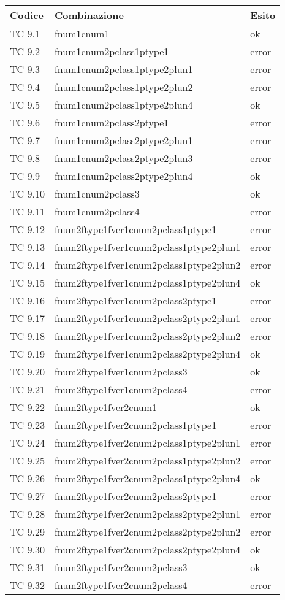 \begin{longtable}{|p{3cm}|p{7cm}|p{3cm}|}
	\hline
	\rowcolor{Gray}
	\textbf{Codice} & \textbf{Combinazione} & \textbf{Esito}\tabularnewline
	\hline
	TC 9.1			& fnum1cnum1					& ok \tabularnewline
	\hline
	TC 9.2			& fnum1cnum2pclass1ptype1			& error \tabularnewline
	\hline
	TC 9.3			& fnum1cnum2pclass1ptype2plun1			& error \tabularnewline
	\hline
	TC 9.4			& fnum1cnum2pclass1ptype2plun2			& error \tabularnewline
	\hline
	TC 9.5			& fnum1cnum2pclass1ptype2plun4			& ok \tabularnewline
	\hline
	TC 9.6			& fnum1cnum2pclass2ptype1			& error \tabularnewline
	\hline
	TC 9.7			& fnum1cnum2pclass2ptype2plun1			& error \tabularnewline
	\hline
	TC 9.8			& fnum1cnum2pclass2ptype2plun3			& error \tabularnewline
	\hline
	TC 9.9			& fnum1cnum2pclass2ptype2plun4			& ok \tabularnewline
	\hline
	TC 9.10			& fnum1cnum2pclass3				& ok \tabularnewline
	\hline
	TC 9.11			& fnum1cnum2pclass4				& error \tabularnewline
	\hline
	TC 9.12			& fnum2ftype1fver1cnum2pclass1ptype1		& error \tabularnewline
	\hline
	TC 9.13			& fnum2ftype1fver1cnum2pclass1ptype2plun1	& error \tabularnewline
	\hline
	TC 9.14			& fnum2ftype1fver1cnum2pclass1ptype2plun2	& error \tabularnewline
	\hline
	TC 9.15			& fnum2ftype1fver1cnum2pclass1ptype2plun4	& ok \tabularnewline
	\hline
	TC 9.16			& fnum2ftype1fver1cnum2pclass2ptype1		& error \tabularnewline
	\hline
	TC 9.17			& fnum2ftype1fver1cnum2pclass2ptype2plun1	& error \tabularnewline
	\hline
	TC 9.18			& fnum2ftype1fver1cnum2pclass2ptype2plun2	& error \tabularnewline
	\hline
	TC 9.19			& fnum2ftype1fver1cnum2pclass2ptype2plun4	& ok \tabularnewline
	\hline
	TC 9.20			& fnum2ftype1fver1cnum2pclass3			& ok \tabularnewline
	\hline
	TC 9.21			& fnum2ftype1fver1cnum2pclass4			& error \tabularnewline
	\hline
	TC 9.22			& fnum2ftype1fver2cnum1				& ok \tabularnewline
	\hline
	TC 9.23			& fnum2ftype1fver2cnum2pclass1ptype1		& error \tabularnewline
	\hline
	TC 9.24			& fnum2ftype1fver2cnum2pclass1ptype2plun1	& error \tabularnewline
	\hline
	TC 9.25			& fnum2ftype1fver2cnum2pclass1ptype2plun2	& error \tabularnewline
	\hline
	TC 9.26			& fnum2ftype1fver2cnum2pclass1ptype2plun4	& ok \tabularnewline
	\hline
	TC 9.27			& fnum2ftype1fver2cnum2pclass2ptype1		& error \tabularnewline
	\hline
	TC 9.28			& fnum2ftype1fver2cnum2pclass2ptype2plun1	& error \tabularnewline
	\hline
	TC 9.29			& fnum2ftype1fver2cnum2pclass2ptype2plun2	& error \tabularnewline
	\hline
	TC 9.30			& fnum2ftype1fver2cnum2pclass2ptype2plun4	& ok \tabularnewline
	\hline
	TC 9.31			& fnum2ftype1fver2cnum2pclass3			& ok \tabularnewline
	\hline
	TC 9.32			& fnum2ftype1fver2cnum2pclass4			& error \tabularnewline

\end{longtable}
